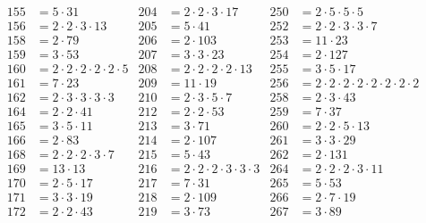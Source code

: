 \begin{align*}
  155&=5\cdot31                              & 204&=2\cdot2\cdot3\cdot17            & 250&=2\cdot5\cdot5\cdot5                         \\
  156&=2\cdot2\cdot3\cdot13                  & 205&=5\cdot41                        & 252&=2\cdot2\cdot3\cdot3\cdot7                   \\
  158&=2\cdot79                              & 206&=2\cdot103                       & 253&=11\cdot23                                   \\
  159&=3\cdot53                              & 207&=3\cdot3\cdot23                  & 254&=2\cdot127                                   \\
  160&=2\cdot2\cdot2\cdot2\cdot2\cdot5       & 208&=2\cdot2\cdot2\cdot2\cdot13      & 255&=3\cdot5\cdot17                              \\
  161&=7\cdot23                              & 209&=11\cdot19                       & 256&=2\cdot2\cdot2\cdot2\cdot2\cdot2\cdot2\cdot2 \\
  162&=2\cdot3\cdot3\cdot3\cdot3             & 210&=2\cdot3\cdot5\cdot7             & 258&=2\cdot3\cdot43                              \\
  164&=2\cdot2\cdot41                        & 212&=2\cdot2\cdot53                  & 259&=7\cdot37                                    \\
  165&=3\cdot5\cdot11                        & 213&=3\cdot71                        & 260&=2\cdot2\cdot5\cdot13                        \\
  166&=2\cdot83                              & 214&=2\cdot107                       & 261&=3\cdot3\cdot29                              \\
  168&=2\cdot2\cdot2\cdot3\cdot7             & 215&=5\cdot43                        & 262&=2\cdot131                                   \\
  169&=13\cdot13                             & 216&=2\cdot2\cdot2\cdot3\cdot3\cdot3 & 264&=2\cdot2\cdot2\cdot3\cdot11                  \\
  170&=2\cdot5\cdot17                        & 217&=7\cdot31                        & 265&=5\cdot53                                    \\
  171&=3\cdot3\cdot19                        & 218&=2\cdot109                       & 266&=2\cdot7\cdot19                              \\
  172&=2\cdot2\cdot43                        & 219&=3\cdot73                        & 267&=3\cdot89                                    \\

\end{align*}
